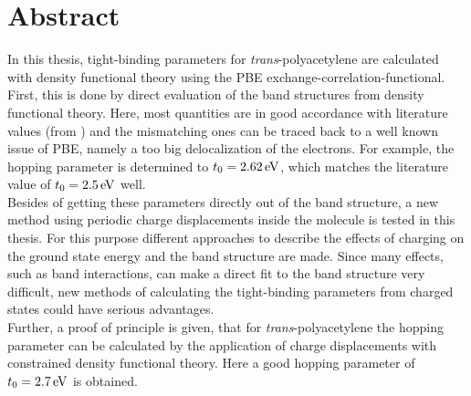 \chapter*{Abstract}
In this thesis, tight-binding parameters for \emph{trans}-polyacetylene are calculated with density functional theory using the PBE exchange-correlation-functional. First, this is done by direct evaluation of the band structures from density functional theory. Here, most quantities are in good accordance with literature values (from \cite{PhysRevLett.42.1698, doi:10.1021/cr990357p}) and the mismatching ones can be traced back to a well known issue of PBE, namely a too big delocalization of the electrons. For example, the hopping parameter is determined to $t_0 = \unit[2.62]{eV}$, which matches the literature value of $t_0 = \unit[2.5]{eV}$ well.\\
Besides of getting these parameters directly out of the band structure, a new method using periodic charge displacements inside the molecule is tested in this thesis. For this purpose different approaches to describe the effects of charging on the ground state energy and the band structure are made. Since many effects, such as band interactions, can make a direct fit to the band structure very difficult, new methods of calculating the tight-binding parameters from charged states could have serious advantages.\\
Further, a proof of principle is given, that for \emph{trans}-polyacetylene the hopping parameter can be calculated by the application of charge displacements with constrained density functional theory. Here a good hopping parameter of $t_0 = \unit[2.7]{eV}$ is obtained.\\

